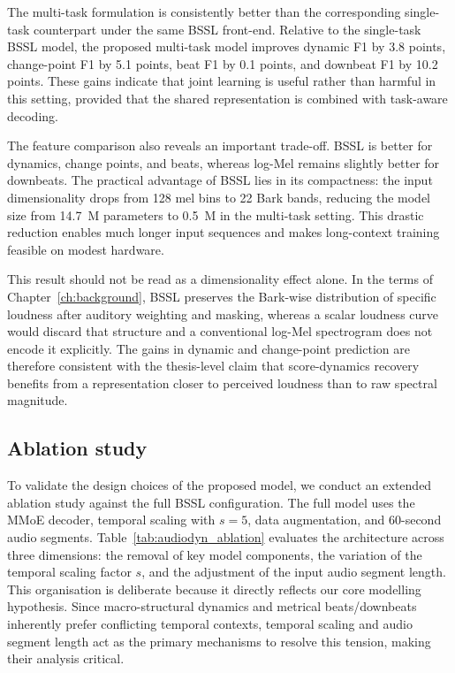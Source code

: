 The multi-task formulation is consistently better than the corresponding single-task counterpart under the same BSSL front-end. Relative to the single-task BSSL model, the proposed multi-task model improves dynamic F1 by 3.8 points, change-point F1 by 5.1 points, beat F1 by 0.1 points, and downbeat F1 by 10.2 points. These gains indicate that joint learning is useful rather than harmful in this setting, provided that the shared representation is combined with task-aware decoding.

The feature comparison also reveals an important trade-off. BSSL is better for dynamics, change points, and beats, whereas log-Mel remains slightly better for downbeats. The practical advantage of BSSL lies in its compactness: the input dimensionality drops from 128 mel bins to 22 Bark bands, reducing the model size from 14.7~M parameters to 0.5~M in the multi-task setting. This drastic reduction enables much longer input sequences and makes long-context training feasible on modest hardware.

This result should not be read as a dimensionality effect alone. In the terms of Chapter~\ref{ch:background}, BSSL preserves the Bark-wise distribution of specific loudness after auditory weighting and masking, whereas a scalar loudness curve would discard that structure and a conventional log-Mel spectrogram does not encode it explicitly. The gains in dynamic and change-point prediction are therefore consistent with the thesis-level claim that score-dynamics recovery benefits from a representation closer to perceived loudness than to raw spectral magnitude.


\subsection{Ablation study}
\label{ssec:audiodyn_ablation}

To validate the design choices of the proposed model, we conduct an extended ablation study against the full BSSL configuration. The full model uses the MMoE decoder, temporal scaling with $s=5$, data augmentation, and 60-second audio segments. Table~\ref{tab:audiodyn_ablation} evaluates the architecture across three dimensions: the removal of key model components, the variation of the temporal scaling factor $s$, and the adjustment of the input audio segment length. This organisation is deliberate because it directly reflects our core modelling hypothesis. Since macro-structural dynamics and metrical beats/downbeats inherently prefer conflicting temporal contexts, temporal scaling and audio segment length act as the primary mechanisms to resolve this tension, making their analysis critical.

